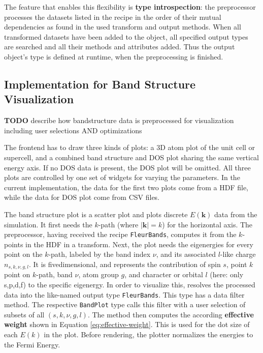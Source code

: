 The feature that enables this flexibility is \textbf{type introspection}: the
preprocessor processes the datasets listed in the recipe in the order of their
mutual dependencies as found in the used transform and output methods. When all
transformed datasets have been added to the object, all specified output types
are searched and all their methods and attributes added. Thus the output
object's type is defined at runtime, when the preprocessing is finished.


% 


\subsection{Implementation for Band Structure Visualization}
\label{sec:preprocessor-implementation}

\textbf{TODO} describe how bandstructure data is preprocessed for visualization
including user selections AND optimizations

The frontend has to draw three kinds of plots: a 3D atom plot of the unit cell
or supercell, and a combined band structure and DOS plot sharing the same
vertical energy axis. If no DOS data is present, the DOS plot will be omitted.
All three plots are controlled by one set of widgets for varying the parameters.
In the current implementation, the data for the first two plots come from a HDF
file, while the data for DOS plot come from CSV files.

The band structure plot is a scatter plot and plots discrete \(E(\mathbf{k})\) data
from the simulation. It first needs the \(k\)-path (where \(|\mathbf{k}|=k\)) for
the horizontal axis. The preprocessor, having received the recipe
\texttt{FleurBands}, computes it from the \(k\)-points in the HDF in a
transform. Next, the plot needs the eigenergies for every point on the
\(k\)-path, labeled by the band index \(\nu\), and its associated \(l\)-like
charge \(n_{s,k,\nu,g,l}\). It is fivedimensional, and represents the
contribution of spin \(s\), point \(k\) point on \(k\)-path, band \(\nu\), atom
group \(g\), and character or orbital \(l\) (here: only s,p,d,f) to the specific
eigenergy. In order to visualize this, resolves the processed data into the
like-named output type \texttt{FleurBands}. This type has a data filter method.
The respective \texttt{BandPlot} type calls this filter with a user selection of
subsets of all \((s,k,\nu,g,l)\). The method then computes the according
\textbf{effective weight} shown in Equation \ref{eq:effective-weight}. This is
used for the dot size of each \(E(k)\) in the plot. Before rendering, the
plotter normalizes the energies to the Fermi Energy.

